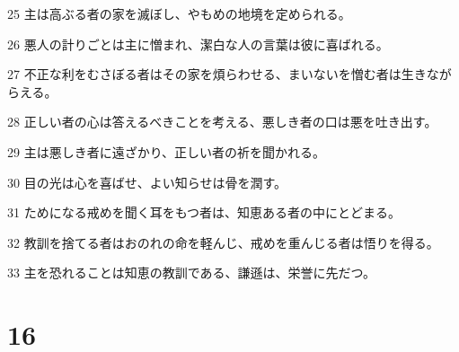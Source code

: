 \par 25 主は高ぶる者の家を滅ぼし、やもめの地境を定められる。
\par 26 悪人の計りごとは主に憎まれ、潔白な人の言葉は彼に喜ばれる。
\par 27 不正な利をむさぼる者はその家を煩らわせる、まいないを憎む者は生きながらえる。
\par 28 正しい者の心は答えるべきことを考える、悪しき者の口は悪を吐き出す。
\par 29 主は悪しき者に遠ざかり、正しい者の祈を聞かれる。
\par 30 目の光は心を喜ばせ、よい知らせは骨を潤す。
\par 31 ためになる戒めを聞く耳をもつ者は、知恵ある者の中にとどまる。
\par 32 教訓を捨てる者はおのれの命を軽んじ、戒めを重んじる者は悟りを得る。
\par 33 主を恐れることは知恵の教訓である、謙遜は、栄誉に先だつ。

\chapter{16}

